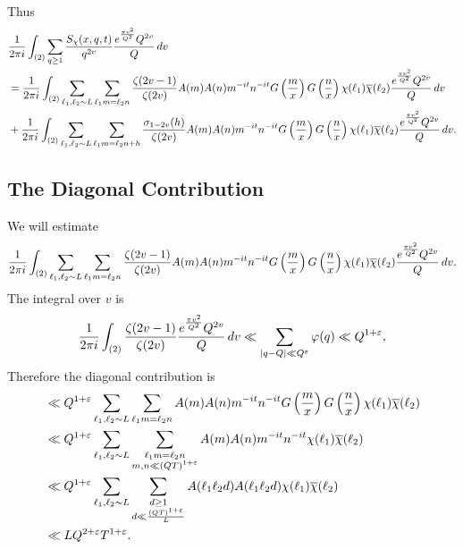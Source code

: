 \documentclass[12pt,reqno,oneside]{amsart}
\begin{document}
    Thus
    \begin{align*}
      &\frac{1}{2\pi i}\int_{(2)}\sum_{q \ge 1}\frac{S_{\chi}(x,q,t)}{q^{2v}}\frac{e^{\frac{\pi v^{2}}{Q^{2}}}Q^{2v}}{Q}\,dv \\
      &= \frac{1}{2\pi i}\int_{(2)}\sum_{\ell_{1},\ell_{2} \sim L}\sum_{\ell_{1}m = \ell_{2}n}\frac{\zeta(2v-1)}{\zeta(2v)}A(m)A(n)m^{-it}n^{-it}G\left(\frac{m}{x}\right)G\left(\frac{n}{x}\right)\chi(\ell_{1})\overline{\chi}(\ell_{2})\frac{e^{\frac{\pi v^{2}}{Q^{2}}}Q^{2v}}{Q}\,dv \\
      &+\frac{1}{2\pi i}\int_{(2)}\sum_{\ell_{1},\ell_{2} \sim L}\sum_{\ell_{1}m = \ell_{2}n+h}\frac{\sigma_{1-2v}(h)}{\zeta(2v)}A(m)A(n)m^{-it}n^{-it}G\left(\frac{m}{x}\right)G\left(\frac{n}{x}\right)\chi(\ell_{1})\overline{\chi}(\ell_{2})\frac{e^{\frac{\pi v^{2}}{Q^{2}}}Q^{2v}}{Q}\,dv.
    \end{align*}
  \subsection*{The Diagonal Contribution}
    We will estimate
    \[
      \frac{1}{2\pi i}\int_{(2)}\sum_{\ell_{1},\ell_{2} \sim L}\sum_{\ell_{1}m = \ell_{2}n}\frac{\zeta(2v-1)}{\zeta(2v)}A(m)A(n)m^{-it}n^{-it}G\left(\frac{m}{x}\right)G\left(\frac{n}{x}\right)\chi(\ell_{1})\overline{\chi}(\ell_{2})\frac{e^{\frac{\pi v^{2}}{Q^{2}}}Q^{2v}}{Q}\,dv.
    \]
    The integral over $v$ is
    \[
      \frac{1}{2\pi i}\int_{(2)}\frac{\zeta(2v-1)}{\zeta(2v)}\frac{e^{\frac{\pi v^{2}}{Q^{2}}}Q^{2v}}{Q}\,dv \ll \sum_{|q-Q| \ll Q^{\varepsilon}}\varphi(q) \ll Q^{1+\varepsilon},
    \]
    Therefore the diagonal contribution is
    \begin{align*}
      &\ll Q^{1+\varepsilon}\sum_{\ell_{1},\ell_{2} \sim L}\sum_{\ell_{1}m = \ell_{2}n}A(m)A(n)m^{-it}n^{-it}G\left(\frac{m}{x}\right)G\left(\frac{n}{x}\right)\chi(\ell_{1})\overline{\chi}(\ell_{2}) \\
      &\ll Q^{1+\varepsilon}\sum_{\ell_{1},\ell_{2} \sim L}\sum_{\substack{\ell_{1}m = \ell_{2}n \\ m,n \ll (QT)^{1+\varepsilon}}}A(m)A(n)m^{-it}n^{-it}\chi(\ell_{1})\overline{\chi}(\ell_{2}) \\
      &\ll Q^{1+\varepsilon}\sum_{\ell_{1},\ell_{2} \sim L}\sum_{\substack{d \ge 1 \\ d \ll \frac{(QT)^{1+\varepsilon}}{L}}}A(\ell_{1}\ell_{2}d)A(\ell_{1}\ell_{2}d)\chi(\ell_{1})\overline{\chi}(\ell_{2}) \\
      &\ll LQ^{2+\varepsilon}T^{1+\varepsilon}.
    \end{align*}
\end{document}
